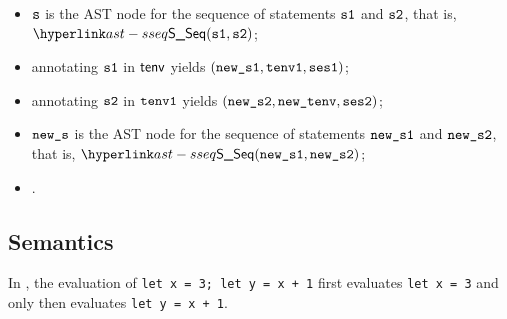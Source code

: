 \ProseParagraph
\AllApply
\begin{itemize}
  \item $\vs$ is the AST node for the sequence of statements $\vsone$ and $\vstwo$, that is, $\SSeq(\vsone, \vstwo)$;
  \item annotating $\vsone$ in $\tenv$ yields $(\newsone, \tenvone, \vsesone)$\ProseOrTypeError;
  \item annotating $\vstwo$ in $\tenvone$ yields $(\newstwo, \newtenv, \vsestwo)$\ProseOrTypeError;
  \item $\news$ is the AST node for the sequence of statements $\newsone$ and $\newstwo$, that is, $\SSeq(\newsone, \newstwo)$;
  \item {}.
\end{itemize}
\FormallyParagraph
\begin{mathpar}
\end{mathpar}

\subsection{Semantics}
In ,
the evaluation of \texttt{let x = 3; let y = x + 1} first evaluates \texttt{let x = 3} and only then
evaluates \texttt{let y = x + 1}.

